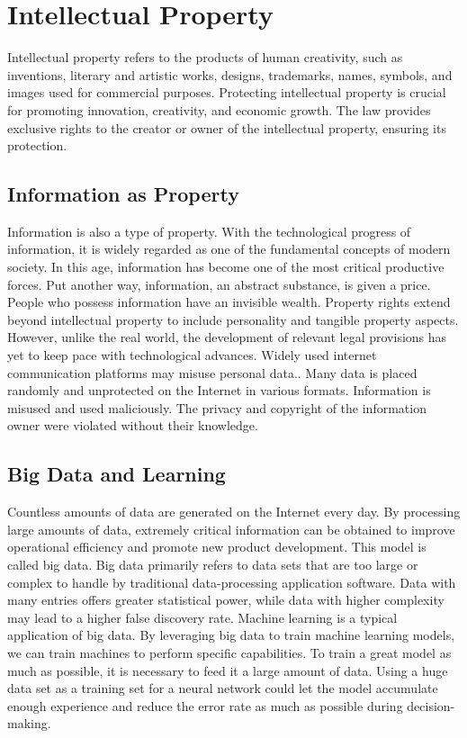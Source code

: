 \documentclass[english,version-2022-01]{uzl-thesis}
\begin{document}
\chapter{Intellectual Property}Intellectual property refers to the products of human creativity, such as inventions, literary and artistic works, designs, trademarks, names, symbols, and images used for commercial purposes. Protecting intellectual property is crucial for promoting innovation, creativity, and economic growth. The law provides exclusive rights to the creator or owner of the intellectual property, ensuring its protection.\cite{national2000digital}
\section{Information as Property} Information is also a type of property. With the technological progress of information, it is widely regarded as one of the fundamental concepts of modern society. In this age, information has become one of the most critical productive forces. Put another way, information, an abstract substance, is given a price. People who possess information have an invisible wealth. Property rights extend beyond intellectual property to include personality and tangible property aspects.\cite{zech2015} However, unlike the real world, the development of relevant legal provisions has yet to keep pace with technological advances. Widely used internet communication platforms may misuse personal data.\cite{DataasProperty}. Many data is placed randomly and unprotected on the Internet in various formats. Information is misused and used maliciously. The privacy and copyright of the information owner were violated without their knowledge.
\section{Big Data and Learning} Countless amounts of data are generated on the Internet every day. By processing large amounts of data, extremely critical information can be obtained to improve operational efficiency and promote new product development. This model is called big data. Big data primarily refers to data sets that are too large or complex to handle by traditional data-processing application software. Data with many entries offers greater statistical power, while data with higher complexity may lead to a higher false discovery rate.\cite{RePEc:pal:jmarka:v:4:y:2016:i:2:d:10.1057_s41270-016-0001-3} Machine learning is a typical application of big data. By leveraging big data to train machine learning models, we can train machines to perform specific capabilities. To train a great model as much as possible, it is necessary to feed it a large amount of data. Using a huge data set as a training set for a neural network could let the model accumulate enough experience and reduce the error rate as much as possible during decision-making. 
\end{document}
